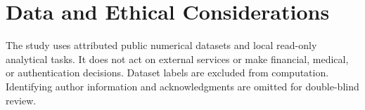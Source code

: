 \documentclass{svproc}
\begin{document}
\section*{Data and Ethical Considerations}
The study uses attributed public numerical datasets and local read-only analytical tasks. It does not act on external services or make financial, medical, or authentication decisions. Dataset labels are excluded from computation. Identifying author information and acknowledgments are omitted for double-blind review.



\end{document}
